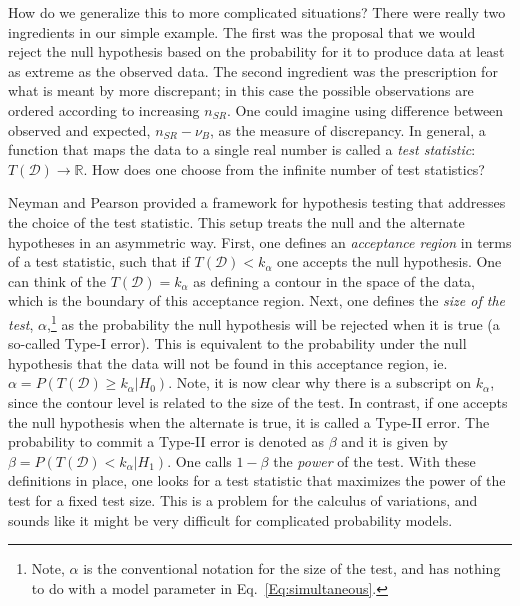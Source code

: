 \documentclass{cernrep}
\newcommand{\data}{{\ensuremath{\mathcal{D}}}}
\begin{document}
How do we generalize this to more complicated situations?  There were really two ingredients in our simple example.  The first was the proposal that we would reject the null hypothesis based on the probability for it to produce data at least as extreme  as the observed data.  The second ingredient was the prescription for what is meant by more discrepant; in this case the possible observations are ordered according to increasing $n_{SR}$.  One could imagine using difference between observed and expected, $n_{SR}-\nu_B$, as the measure of discrepancy.  In general, a function that maps the data to a single real number is called a \textit{test statistic}: $T(\data)\to\mathbb{R}$.  How does one choose from the infinite number of test statistics?

Neyman and Pearson provided a framework for hypothesis testing that addresses the choice of the test statistic.  This setup treats the null and the alternate hypotheses in an asymmetric way.  First, one defines an \textit{acceptance region} in terms of a test statistic, such that if $T(\data)< k_\alpha$ one accepts the null hypothesis.  One can think of the $T(\data) = k_\alpha$ as defining a contour in the space of the data, which is the boundary of this acceptance region.  Next, one defines the \textit{size of the test}, $\alpha$,\footnote{Note, $\alpha$ is the conventional notation for the size of the test, and has nothing to do with a model parameter in Eq.~\ref{Eq:simultaneous}.} as the probability the null hypothesis will be rejected when it is true (a so-called Type-I error).  This is equivalent to the probability under the null hypothesis that the data will not be found in this acceptance region, ie. $\alpha = P(T(\data) \ge k_\alpha | H_0)$.  Note, it is now clear why there is a subscript on $k_\alpha$, since the contour level is related to the size of the test.  In contrast, if one accepts the null hypothesis when the alternate is true, it is called a Type-II error.  The probability to commit a Type-II error is denoted as $\beta$ and it is given by $\beta=P(T(\data) < k_\alpha|H_1)$.  One calls $1-\beta$ the \textit{power} of the test.  With these definitions in place, one looks for a test statistic that maximizes the power of the test for a fixed test size.  This is a problem for the calculus of variations, and sounds like it might be very difficult for complicated probability models. 
\end{document}
